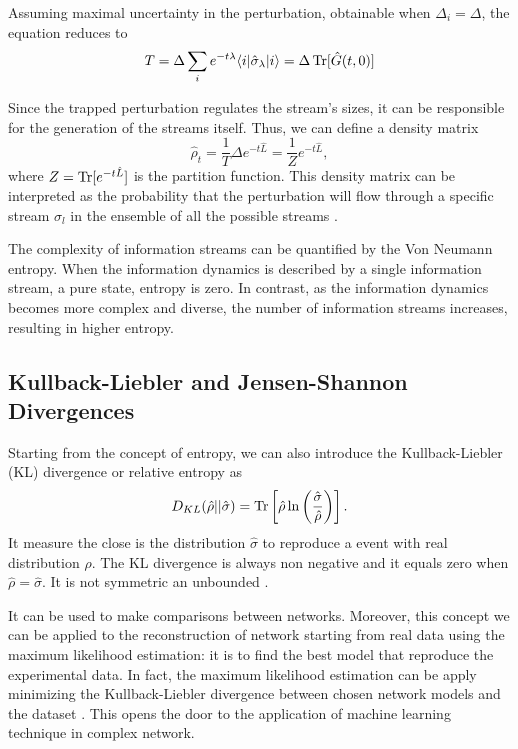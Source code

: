 Assuming maximal uncertainty in the perturbation, obtainable when $\Delta_i = \Delta$, the equation reduces to
\begin{equation}
    T = \Delta \sum_i e^{-t\lambda} \langle i\rvert  \hat \sigma_\lambda \lvert i\rangle = \Delta \operatorname{Tr} [\hat G(t,0)]
\end{equation}

Since the trapped perturbation regulates the stream's sizes, it can be responsible for the generation of the streams itself. 
Thus, we can define a density matrix 
\begin{equation}
    \hat \rho_t = \frac{1}{T} \Delta e^{-t\hat L} =  \frac{1}{Z} e^{-t\hat L},
\end{equation}
where $Z = \operatorname{Tr}[e^{-t\hat L}] $ is the partition function.
This density matrix can be interpreted as the probability that the perturbation will flow through a specific stream $\hat \sigma_l$ in the ensemble of all the possible streams \cite{De_Domenico_2020}.

The complexity of information streams can be quantified by the Von Neumann entropy.
When the information dynamics is described by a single information stream, a pure state, entropy is zero.
In contrast, as the information dynamics becomes more complex and diverse, the number of information streams increases, resulting in higher entropy.

\subsection{Kullback-Liebler and Jensen-Shannon Divergences}
Starting from the concept of entropy, we can also introduce the Kullback-Liebler (KL) divergence or relative entropy \cite{K-L_divergence} as
\begin{equation}\label{KL_divergence}
    D_{KL}(\hat \rho || \hat \sigma) = \operatorname{Tr} \left[\hat \rho \ln\left(\frac{\hat\sigma}{\hat\rho}\right)\right].
\end{equation}
It measure the close is the distribution $\hat \sigma$ to reproduce a event with real distribution $\hat \rho$. 
The KL divergence is always non negative and it equals zero when $\hat \rho = \hat \sigma$. It is not symmetric an unbounded \cite{J-S_divergence}.

It can be used to make comparisons between networks. Moreover, this concept we can be applied to the reconstruction of network starting from real data using the maximum likelihood estimation: it is to find the best model that reproduce the experimental data. In fact, the maximum likelihood estimation can be apply minimizing the Kullback-Liebler divergence between chosen network models and the dataset \cite{De_Domenico_2016}. This opens the door to the application of machine learning technique in complex network.


